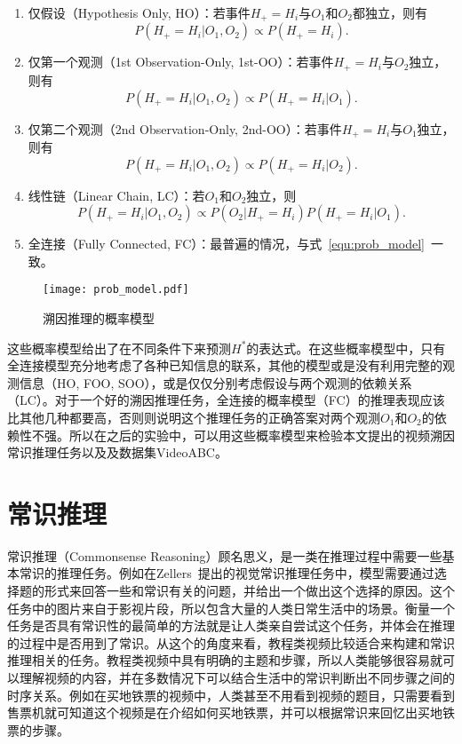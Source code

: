 \begin{enumerate}
    \item 仅假设（Hypothesis Only, HO）：若事件$H_+=H_i$与$O_1$和$O_2$都独立，则有
    \begin{equation}
        P(H_+=H_i | O_{1}, O_{2})\propto  P(H_+=H_i).
    \end{equation}
    \item 仅第一个观测（1st Observation-Only, 1st-OO）：若事件$H_+=H_i$与$O_2$独立，则有
    \begin{equation}
        P(H_+=H_i | O_{1}, O_{2})\propto  P(H_+=H_i|O_1).
    \end{equation}
    \item 仅第二个观测（2nd Observation-Only, 2nd-OO）：若事件$H_+=H_i$与$O_1$独立，则有
    \begin{equation}
        P(H_+=H_i | O_{1}, O_{2})\propto  P(H_+=H_i|O_2).
    \end{equation}
    \item 线性链（Linear Chain, LC）：若$O_1$和$O_2$独立，则
    \begin{equation}
        P(H_+=H_i | O_{1}, O_{2})\propto  P(O_2|H_+=H_i)P(H_+=H_i|O_1).
        \label{equ:LC}
    \end{equation}
    \item 全连接（Fully Connected, FC）：最普遍的情况，与式~\eqref{equ:prob_model}~一致。
\end{enumerate}
\begin{figure}[t]
    \centering
    \texttt{[image: prob\_model.pdf]}
    \caption{溯因推理的概率模型}
    \label{fig:prob_model}
\end{figure}
这些概率模型给出了在不同条件下来预测$H^*$的表达式。在这些概率模型中，只有全连接模型充分地考虑了各种已知信息的联系，其他的模型或是没有利用完整的观测信息（HO, FOO, SOO），或是仅仅分别考虑假设与两个观测的依赖关系（LC）。对于一个好的溯因推理任务，全连接的概率模型（FC）的推理表现应该比其他几种都要高，否则则说明这个推理任务的正确答案对两个观测$O_1$和$O_2$的依赖性不强。所以在之后的实验中，可以用这些概率模型来检验本文提出的视频溯因常识推理任务以及及数据集VideoABC。

\section{常识推理}\label{sec:commonsense}
常识推理（Commonsense Reasoning）顾名思义，是一类在推理过程中需要一些基本常识的推理任务。例如在Zellers~\etal 提出的视觉常识推理\cite{zellers2019recognition}任务中，模型需要通过选择题的形式来回答一些和常识有关的问题，并给出一个做出这个选择的原因。这个任务中的图片来自于影视片段，所以包含大量的人类日常生活中的场景。衡量一个任务是否具有常识性的最简单的方法就是让人类亲自尝试这个任务，并体会在推理的过程中是否用到了常识。从这个的角度来看，教程类视频比较适合来构建和常识推理相关的任务。教程类视频中具有明确的主题和步骤，所以人类能够很容易就可以理解视频的内容，并在多数情况下可以结合生活中的常识判断出不同步骤之间的时序关系。例如在买地铁票的视频中，人类甚至不用看到视频的题目，只需要看到售票机就可知道这个视频是在介绍如何买地铁票，并可以根据常识来回忆出买地铁票的步骤。

